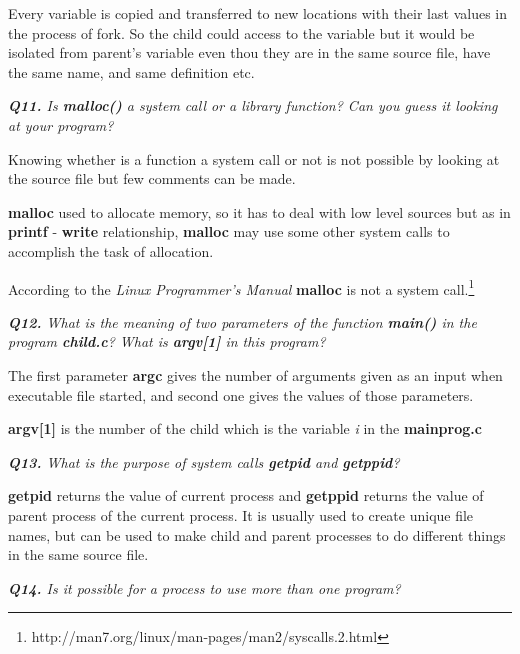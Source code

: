 \documentclass[11pt]{article}
\begin{document}
Every variable is copied and transferred to new locations with their last values in the process of fork. So the child could access to the variable but it would be isolated from parent's variable even thou they are in the same source file, have the same name, and same definition etc.

\vspace{5mm}
\textit{\textbf{Q11.} Is \textbf{malloc()} a system call or a library function? Can you guess it looking at your program?}
\vspace{5mm}

Knowing whether is a function a system call or not is not possible by looking at the source file but few comments can be made.

\textbf{malloc} used to allocate memory, so it has to deal with low level sources but as in \textbf{printf} - \textbf{write} relationship, \textbf{malloc} may use some other system calls to accomplish the task of allocation.

According to the \textit{Linux Programmer's Manual} \textbf{malloc} is not a system call.\footnote{http://man7.org/linux/man-pages/man2/syscalls.2.html}

\vspace{5mm}
\textit{\textbf{Q12.} What is the meaning of two parameters of the function \textbf{main()} in the program \textbf{child.c}? What is \textbf{argv[1]} in this program?}
\vspace{5mm}

The first parameter \textbf{argc} gives the number of arguments given as an input when executable file started, and second one gives the values of those parameters. 

\textbf{argv[1]} is the number of the child which is the variable \textit{i} in the \textbf{mainprog.c}

\vspace{5mm}
\textit{\textbf{Q13.} What is the purpose of system calls \textbf{getpid} and \textbf{getppid}?}
\vspace{5mm}

 \textbf{getpid} returns the value of current process and  \textbf{getppid} returns the value of parent process of the current process. It is usually used to create unique file names, but can be used to make child and parent processes to do different things in the same source file.

\vspace{5mm}
\textit{\textbf{Q14.} Is it possible for a process to use more than one program?}
\vspace{5mm}
\end{document}
